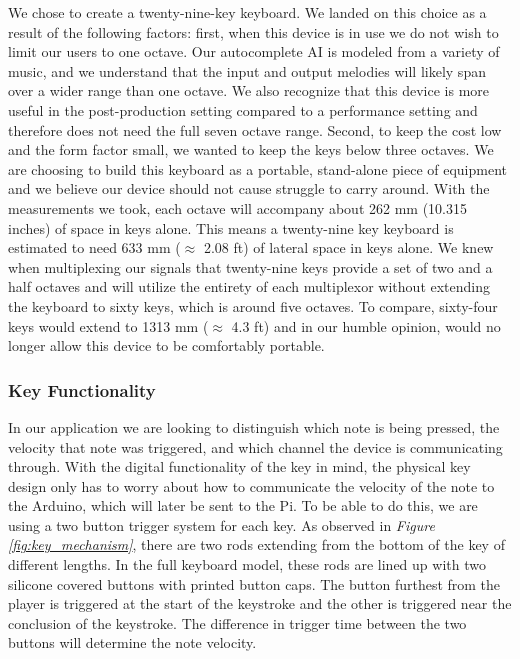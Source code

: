 We chose to create a twenty-nine-key keyboard. We landed on this choice as a result of the following factors: first, when this device is in use we do not wish to limit our users to one octave. Our autocomplete AI is modeled from a variety of music, and we understand that the input and output melodies will likely span over a wider range than one octave. We also recognize that this device is more useful in the post-production setting compared to a performance setting and therefore does not need the full seven octave range. Second, to keep the cost low and the form factor small, we wanted to keep the keys below three octaves. We are choosing to build this keyboard as a portable, stand-alone piece of equipment and we believe our device should not cause struggle to carry around. With the measurements we took, each octave will accompany about 262 mm (10.315 inches) of space in keys alone. This means a twenty-nine key keyboard is estimated to need 633 mm ($ \approx $ 2.08 ft) of lateral space in keys alone. We knew when multiplexing our signals that twenty-nine keys provide a set of two and a half octaves and will utilize the entirety of each multiplexor without extending the keyboard to sixty keys, which is around five octaves. To compare, sixty-four keys would extend to 1313 mm ($ \approx $ 4.3 ft) and in our humble opinion, would no longer allow this device to be comfortably portable.

\subsubsection{Key Functionality}

In our application we are looking to distinguish which note is being pressed, the velocity that note was triggered, and which channel the device is communicating through. With the digital functionality of the key in mind, the physical key design only has to worry about how to communicate the velocity of the note to the Arduino, which will later be sent to the Pi. To be able to do this, we are using a two button trigger system for each key. As observed in \textit{Figure \ref{fig:key_mechanism}}, there are two rods extending from the bottom of the key of different lengths. In the full keyboard model, these rods are lined up with two silicone covered buttons with printed button caps. The button furthest from the player is triggered at the start of the keystroke and the other is triggered near the conclusion of the keystroke. The difference in trigger time between the two buttons will determine the note velocity.

